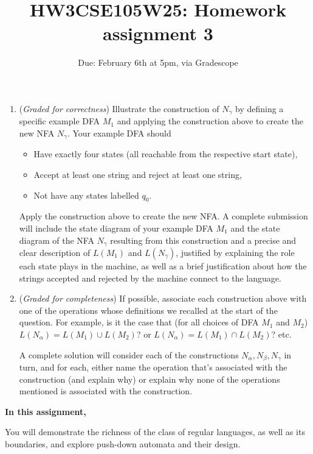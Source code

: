 \documentclass[12pt, oneside]{article}
\newcommand{\gradeCorrect}{({\it Graded for correctness}) }
\newcommand{\gradeComplete}{({\it Graded for completeness}) }
\begin{document}
\begin{enumerate}[wide, labelwidth=!, labelindent=0pt]
\begin{enumerate}
\item\gradeCorrect 
Illustrate the construction of $N_{\gamma}$ by defining a specific
example DFA $M_1$  and applying the 
construction above to create the new NFA $N_\gamma$. Your example DFA should
\begin{itemize}
    \item Have exactly four states (all reachable from the respective start state),
    \item Accept at least one string and reject at least one string, 
    \item Not have any states labelled $q_0$.
\end{itemize}
Apply the construction above to create the new NFA. A complete submission 
will include the state diagram of your example DFA $M_1$ and the state diagram of the NFA $N_\gamma$ resulting 
from this construction and a precise and clear description of $L(M_1)$ and $L(N_{\gamma})$, justified
by explaining the role each state plays in the machine, as well as a brief 
justification about how the strings accepted and rejected by the machine connect to the language.

\item \gradeComplete If possible, associate each construction above with one of the operations whose definitions we recalled at the start of the question.  For example, is it the case that (for all choices of DFA $M_1$ and $M_2$) $L(N_\alpha) = L(M_1) \cup L(M_2)$? or $L(N_\alpha) = L(M_1) \cap L(M_2)$? etc.

A complete solution will consider each of the constructions $N_\alpha, N_\beta, N_\gamma$ in turn, and for each, either name the operation that's associated with the construction (and explain why) or explain why none of the operations mentioned is associated with the construction.
\end{enumerate}

\end{enumerate}
\newpage

\title{HW3CSE105W25: Homework assignment 3}
\date{Due: February 6th at 5pm, via Gradescope}


\maketitle
\thispagestyle{fancy}

{\bf In this assignment,}

You will demonstrate the richness of the class of regular languages, as well as its boundaries, and explore push-down automata and their design.
\end{document}
